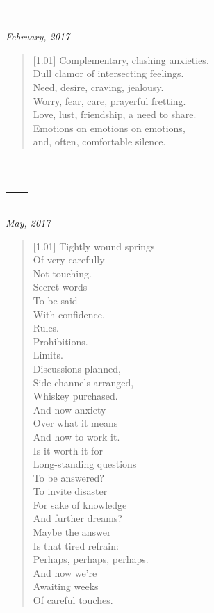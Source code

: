 \section*{---}

\hfill\textit{February, 2017}

\begin{verse}[1.01\textwidth]
  Complementary, clashing anxieties.\\
  Dull clamor of intersecting feelings.\\
  Need, desire, craving, jealousy.\\
  Worry, fear, care, prayerful fretting.\\
  Love, lust, friendship, a need to share.\\
  Emotions on emotions on emotions,\\
  and, often, comfortable silence.
\end{verse}
\newpage

\section*{---}

\vspace{-0.5cm}

\hfill\textit{May, 2017}

\begin{verse}[1.01\textwidth]
  Tightly wound springs\\
  Of very carefully\\
  Not touching.\\
  \vin Secret words\\
  \vin To be said\\
  \vin With confidence.\\
  Rules.\\
  Prohibitions.\\
  Limits.\\
  \vin Discussions planned,\\
  \vin Side-channels arranged,\\
  \vin Whiskey purchased.\\
  And now anxiety\\
  Over what it means\\
  And how to work it.\\
  \vin Is it worth it for\\
  \vin Long-standing questions\\
  \vin To be answered?\\
  To invite disaster\\
  For sake of knowledge\\
  And further dreams?\\
  \vin Maybe the answer\\
  \vin Is that tired refrain:\\
  \vin Perhaps, perhaps, perhaps.\\
  And now we're\\
  Awaiting weeks\\
  Of careful touches.
\end{verse}
\newpage

